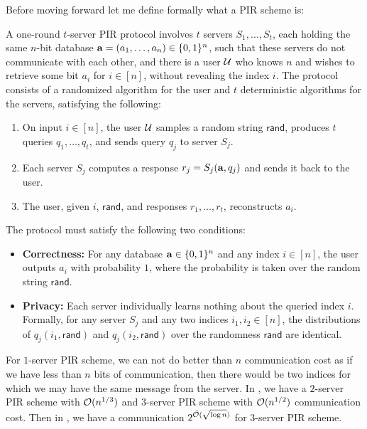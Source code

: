 Before moving forward let me define formally what a PIR scheme is:
\begin{definition}

    A one-round $t$-server PIR protocol involves $t$ servers $S_1, \ldots, S_t$, each holding
the same $n$-bit database $\mathbf{a} = (a_1, \ldots, a_n) \in \{0,1\}^n$, such that
these servers do not communicate with each other, and there is a user $\mathcal{U}$
who knows $n$ and wishes to retrieve some bit $a_i$ for $i \in [n]$, without revealing
the index $i$. The protocol consists of a randomized algorithm for the user and $t$
deterministic algorithms for the servers, satisfying the following:

\begin{enumerate}
    \item On input $i \in [n]$, the user $\mathcal{U}$ samples a random string $\mathsf{rand}$,
    produces $t$ queries $q_1, \ldots, q_t$, and sends query $q_j$ to server $S_j$.

    \item Each server $S_j$ computes a response $r_j = S_j(\mathbf{a}, q_j)$ and sends
    it back to the user.

    \item The user, given $i$, $\mathsf{rand}$, and responses $r_1, \ldots, r_t$,
    reconstructs $a_i$.
\end{enumerate}

\noindent The protocol must satisfy the following two conditions:

\begin{itemize}
    \item \textbf{Correctness:} For any database $\mathbf{a} \in \{0,1\}^n$ and any
    index $i \in [n]$, the user outputs $a_i$ with probability $1$, where the
    probability is taken over the random string $\mathsf{rand}$.

    \item \textbf{Privacy:} Each server individually learns nothing about the queried
    index $i$. Formally, for any server $S_j$ and any two indices $i_1, i_2 \in [n]$,
    the distributions of $q_j(i_1, \mathsf{rand})$ and $q_j(i_2, \mathsf{rand})$ over
    the randomness $\mathsf{rand}$ are identical.
\end{itemize}
    
\end{definition}

For $1$-server PIR scheme, we can not do better than $n$ communication cost as if we have less than $n$ bits of communication, then there would be two indices for which we may have the same message from the server. In \cite{pir-sudan}, we have a $2$-server PIR scheme with $\mathcal{O}(n^{1/3})$ and $3$-server PIR scheme with $\mathcal{O}(n^{1/2})$ communication cost. Then in \cite{efr09}, we have a communication $2^{\tilde{\mathcal{O}}(\sqrt{\log n})}$ for $3$-server PIR scheme.  


